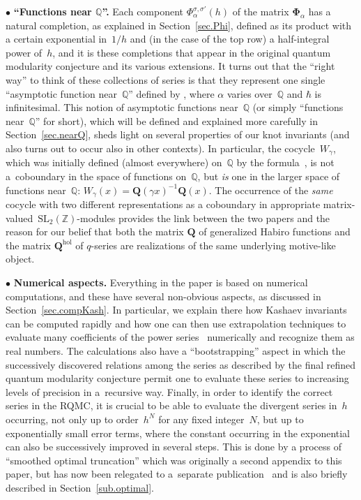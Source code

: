 \documentclass[pdftex]{sigma}
\numberwithin{equation}{section}
\def\BQ{\mathbb Q}
\def\BJ{\mathbb J}
\def\l{\lambda}
\def\wt{\widetilde}
\def\SL{\mathrm{SL}}
\def\Phih{\widehat\Phi}
\def\a{\alpha}
\def\l{\lambda}
\def\Z{\mathbb Z}
\def\Q{\mathbb Q}
\def\i{^{-1}}
\def\a{\alpha}
\def\l{\lambda}
\def\s{\sigma}
\def\BJ{{\mathbf Q}} %
\def\g{\gamma}
\def\bJ{J} \def\bJ{\mathbf{J}}
\def\hol{\mathrm{hol}}
\def\bPhi{\mathbf\Phi}
\def\jp{\mathbf{j}}
\def\jt{\jp_\l} %
\def\jt{\jp_{\text{tw}}} %
\def\jt{\jp_{\textsf T}} %
\def\jt{\jp^{(\l)}}
\def\jt{\jp^{(\l)}}
\def\jt{\wt{\jp}}
\begin{document}
$\bullet$ {\bf ``Functions near $\boldsymbol{\BQ}$''.}
Each component $\Phi_\a^{\s,\s'}(h)$
of the matrix $\bPhi_\a$ has a natural completion, as explained in Section~\ref{sec.Phi}, defined
as its product with a certain exponential in~$1/h$ and (in the case of the top row)
a half-integral power of~$h$, and it is these completions that appear in the original
quantum modularity conjecture and its various extensions. It turns out that the
``right way'' to think of these collections of series is that they represent one single
``asymptotic function near~$\Q$'' defined by
\smash{$\BJ^{(\s,\s')}(\a-\hbar)=\Phih_\a^{\s,\s'}(2\pi {\rm i}\hbar)$}, where $\a$ varies over~$\Q$ and
$\hbar$ is infinitesimal. This notion of asymptotic functions near~$\Q$ (or simply
``functions near~$\Q$'' for short), which will be defined and explained more carefully
in Section~\ref{sec.nearQ}, sheds light on several properties of our knot invariants
(and also turns out to occur also in other contexts). In particular, the cocycle~$W_\g$,
which was initially defined (almost everywhere) on~$\Q$ by the formula~\smash{$W_\g(x)=\bJ(\g x)\i\jt_\g(X)\bJ(x)$}, is not a~coboundary in the space of functions
on~$\Q$, but \emph{is} one in the larger space of functions
near~$\Q$: $W_\g(x)=\BJ(\g x)\i \BJ(x)$. The occurrence of the \emph{same} cocycle with
two different representations as a coboundary in appropriate matrix-valued~$\SL_2(\Z)$-modules provides the link between the two papers and the reason for our
belief that both the matrix $\BJ$ of generalized Habiro functions and the matrix
$\BJ^\hol$ of $q$-series are realizations of the same underlying motive-like object.

$\bullet$ {\bf Numerical aspects.}
Everything in the paper is based on
numerical computations, and these have several non-obvious aspects, as discussed in
Section~\ref{sec.compKash}. In particular, we explain there how Kashaev invariants can
be computed rapidly and how one can then use extrapolation techniques to evaluate many
coefficients of the power series~\smash{$\Phi^{(\s,\s')}_a(h)$} numerically and recognize them
as real numbers. The calculations also have a ``bootstrapping'' aspect in which the
successively discovered relations among the series as described by the final refined
quantum modularity conjecture permit one to evaluate these series to increasing levels
of precision in a~recursive way. Finally, in order to identify the correct series in
the RQMC, it is crucial to be able to evaluate the divergent series in~$h$ occurring,
not only up to order~$h^N$ for any fixed integer~$N$, but up to exponentially small
error terms, where the constant occurring in the exponential can also be successively
improved in several steps. This is done by a process of ``smoothed optimal truncation''
which was originally a second appendix to this paper, but has now been relegated to a~separate publication~\cite{GZ:optimal} and is also briefly described in
Section~\ref{sub.optimal}.
\end{document}
